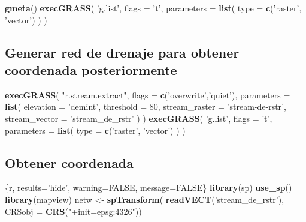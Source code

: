 \documentclass[11pt,]{article}
\newenvironment{Shaded}{\begin{snugshade}}{\end{snugshade}}
\newcommand{\KeywordTok}[1]{\textcolor[rgb]{0.13,0.29,0.53}{\textbf{#1}}}
\newcommand{\DataTypeTok}[1]{\textcolor[rgb]{0.13,0.29,0.53}{#1}}
\newcommand{\DecValTok}[1]{\textcolor[rgb]{0.00,0.00,0.81}{#1}}
\newcommand{\StringTok}[1]{\textcolor[rgb]{0.31,0.60,0.02}{#1}}
\newcommand{\OtherTok}[1]{\textcolor[rgb]{0.56,0.35,0.01}{#1}}
\newcommand{\NormalTok}[1]{#1}
\begin{document}
\begin{Shaded}
\begin{Highlighting}[]
\KeywordTok{gmeta}\NormalTok{()}
\KeywordTok{execGRASS}\NormalTok{(}
  \StringTok{'g.list'}\NormalTok{,}
  \DataTypeTok{flags =} \StringTok{'t'}\NormalTok{,}
  \DataTypeTok{parameters =} \KeywordTok{list}\NormalTok{(}
    \DataTypeTok{type =} \KeywordTok{c}\NormalTok{(}\StringTok{'raster'}\NormalTok{, }\StringTok{'vector'}\NormalTok{)}
\NormalTok{  )}
\NormalTok{)}
\end{Highlighting}
\end{Shaded}

\subsection{Generar red de drenaje para obtener coordenada
posteriormente}\label{generar-red-de-drenaje-para-obtener-coordenada-posteriormente}

\begin{Shaded}
\begin{Highlighting}[]
\KeywordTok{execGRASS}\NormalTok{(}
  \StringTok{"r.stream.extract"}\NormalTok{,}
  \DataTypeTok{flags =} \KeywordTok{c}\NormalTok{(}\StringTok{'overwrite'}\NormalTok{,}\StringTok{'quiet'}\NormalTok{),}
  \DataTypeTok{parameters =} \KeywordTok{list}\NormalTok{(}
    \DataTypeTok{elevation =} \StringTok{'demint'}\NormalTok{,}
    \DataTypeTok{threshold =} \DecValTok{80}\NormalTok{,}
    \DataTypeTok{stream_raster =} \StringTok{'stream-de-rstr'}\NormalTok{,}
    \DataTypeTok{stream_vector =} \StringTok{'stream_de_rstr'}
\NormalTok{  )}
\NormalTok{)}
\KeywordTok{execGRASS}\NormalTok{(}
  \StringTok{'g.list'}\NormalTok{,}
  \DataTypeTok{flags =} \StringTok{'t'}\NormalTok{,}
  \DataTypeTok{parameters =} \KeywordTok{list}\NormalTok{(}
    \DataTypeTok{type =} \KeywordTok{c}\NormalTok{(}\StringTok{'raster'}\NormalTok{, }\StringTok{'vector'}\NormalTok{)}
\NormalTok{  )}
\NormalTok{)}
\end{Highlighting}
\end{Shaded}

\subsection{Obtener coordenada}\label{obtener-coordenada-1}

\begin{Shaded}
\begin{Highlighting}[]
\NormalTok{   \{r, results=}\StringTok{'hide'}\NormalTok{, warning=}\OtherTok{FALSE}\NormalTok{, message=}\OtherTok{FALSE}\NormalTok{\}}
\KeywordTok{library}\NormalTok{(sp)}
\KeywordTok{use_sp}\NormalTok{()}
\KeywordTok{library}\NormalTok{(mapview)}
\NormalTok{netw <-}\StringTok{ }\KeywordTok{spTransform}\NormalTok{(}
  \KeywordTok{readVECT}\NormalTok{(}\StringTok{'stream_de_rstr'}\NormalTok{),}
  \DataTypeTok{CRSobj =} \KeywordTok{CRS}\NormalTok{(}\StringTok{"+init=epsg:4326"}\NormalTok{))}
\end{Highlighting}
\end{Shaded}
\end{document}
